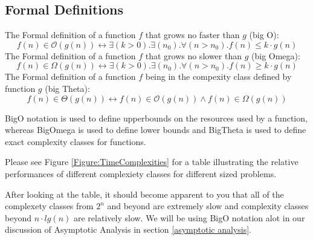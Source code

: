 \documentclass[12pt, letterpaper]{book}
\newcommand{\bigO}{\mathcal{O}}
\newcommand{\bigOmega}{\Omega}
\newcommand{\bigTheta}{\Theta}
\begin{document}
\subsection{Formal Definitions}

The Formal definition of a function $f$ that grows no faster than $g$ (big O):
$$f(n) \in \bigO(g(n)) \leftrightarrow \exists(k > 0).\exists(n_{0}). \forall(n > n_{0}).f(n) \le k \cdot g(n)$$
The Formal definition of a function $f$ that grows no slower than $g$ (big Omega):
$$f(n) \in \bigOmega(g(n)) \leftrightarrow \exists(k > 0).\exists(n_{0}). \forall(n > n_{0}).f(n) \ge k \cdot g(n)$$
The Formal definition of a function $f$ being in the compexity class defined by function $g$ (big Theta):
$$f(n) \in \bigTheta(g(n)) \leftrightarrow f(n) \in \bigO(g(n)) \wedge f(n) \in \bigOmega(g(n))$$

BigO notation is used to define upperbounds on the resources used by a function, whereas BigOmega is used to define lower bounds and BigTheta is used to define exact complexity classes for functions.

Please see Figure \ref{Figure:TimeComplexities} for a table illustrating the relative performances of different complexiety classes for different sized problems.

After looking at the table, it should become apparent to you that all of the complexety classes from $2^{n}$ and beyond are extremely slow and complexity classes beyond $n \cdot lg(n)$ are relatively slow. We will be using BigO notation alot in our discussion of Asymptotic Analysis in section \ref{asymptotic analysis}.
\end{document}
